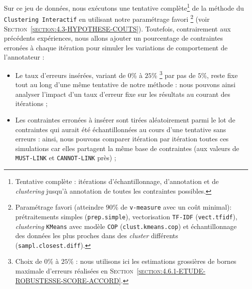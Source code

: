 			Sur ce jeu de données, nous exécutons une tentative complète\footnote{
				Tentative complète : itérations d'échantillonnage, d'annotation et de \textit{clustering} jusqu'à annotation de toutes les contraintes possibles.
			} de la méthode du \texttt{Clustering Interactif} en utilisant notre paramétrage favori \footnote{
				Paramétrage favori (atteindre $90$\% de \texttt{v-measure} avec un coût minimal): prétraitements simples (\texttt{prep.simple}), vectorisation \texttt{TF-IDF} (\texttt{vect.tfidf}), \textit{clustering} \texttt{KMeans} avec modèle \texttt{COP} (\texttt{clust.kmeans.cop}) et échantillonnage des données les plus proches dans des \textit{cluster} différents (\texttt{sampl.closest.diff}).
			} (voir \textsc{Section~\ref{section:4.3-HYPOTHESE-COUTS}}).
			Toutefois, contrairement aux précédents expériences, nous allons ajouter un pourcentage de contraintes erronées à chaque itération pour simuler les variations de comportement de l'annotateur :
			\begin{itemize}
				\item Le taux d'erreurs insérées, variant de $0$\% à $25$\% \footnote{
					Choix de $0$\% à $25$\% : nous utilisons ici les estimations grossières de bornes maximale d'erreurs réalisées en \textsc{Section~\ref{section:4.6.1-ETUDE-ROBUSTESSE-SCORE-ACCORD}}.
				} par pas de $5$\%, reste fixe tout au long d'une même tentative de notre méthode : nous pouvons ainsi analyser l'impact d'un taux d'erreur fixe sur les résultats au courant des itérations ;
				\item Les contraintes erronées à insérer sont tirées aléatoirement parmi le lot de contraintes qui aurait été échantillonnées au cours d'une tentative sans erreurs : ainsi, nous pouvons comparer itération par itération toutes ces simulations car elles partagent la même base de contraintes (aux valeurs de \texttt{MUST-LINK} et \texttt{CANNOT-LINK} près) ;
			\end{itemize}
			
